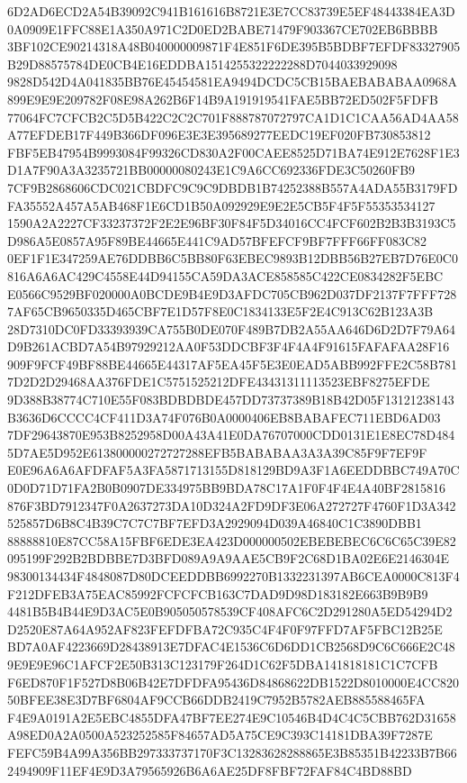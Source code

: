 \documentclass[UTF8,fontset=fandol,zihao=-4,a4paper]{ctexart}
\begin{document}
{{6D2AD6ECD2A54B39092C941B161616B8721E3E7CC83739E5EF48443384EA3D0A0909E1FFC88E1A350A971C2D0ED2BABE71479F903367CE702EB6BBBB
3BF102CE90214318A48B040000009871F4E851F6DE395B5BDBF7EFDF83327905B29D88575784DE0CB4E16EDDBA1514255322222288D7044033929098
9828D542D4A041835BB76E45454581EA9494DCDC5CB15BAEBABABAA0968A899E9E9E209782F08E98A262B6F14B9A191919541FAE5BB72ED502F5FDFB
77064FC7CFCB2C5D5B422C2C2C701F888787072797CA1D1C1CAA56AD4AA58A77EFDEB17F449B366DF096E3E3E395689277EEDC19EF020FB730853812
FBF5EB47954B9993084F99326CD830A2F00CAEE8525D71BA74E912E7628F1E3D1A7F90A3A3235721BB00000080243E1C9A6CC692336FDE3C50260FB9
7CF9B2868606CDC021CBDFC9C9C9DBDB1B74252388B557A4ADA55B3179FDFA35552A457A5AB468F1E6CD1B50A092929E9E2E5CB5F4F5F55353534127
1590A2A2227CF33237372F2E2E96BF30F84F5D34016CC4FCF602B2B3B3193C5D986A5E0857A95F89BE44665E441C9AD57BFEFCF9BF7FFF66FF083C82
0EF1F1E347259AE76DDBB6C5BB80F63EBEC9893B12DBB56B27EB7D76E0C0816A6A6AC429C4558E44D94155CA59DA3ACE858585C422CE0834282F5EBC
E0566C9529BF020000A0BCDE9B4E9D3AFDC705CB962D037DF2137F7FFF7287AF65CB9650335D465CBF7E1D57F8E0C1834133E5F2E4C913C62B123A3B
28D7310DC0FD33393939CA755B0DE070F489B7DB2A55AA646D6D2D7F79A64D9B261ACBD7A54B97929212AA0F53DDCBF3F4F4A4F91615FAFAFAA28F16
909F9FCF49BF88BE44665E44317AF5EA45F5E3E0EAD5ABB992FFE2C58B7817D2D2D29468AA376FDE1C5751525212DFE43431311113523EBF8275EFDE
9D388B38774C710E55F083BDBDBDE457DD73737389B18B42D05F13121238143B3636D6CCCC4CF411D3A74F076B0A0000406EB8BABAFEC711EBD6AD03
7DF29643870E953B8252958D00A43A41E0DA76707000CDD0131E1E8EC78D4845D7AE5D952E613800000272727288EFB5BABABAA3A3A39C85F9F7EF9F
E0E96A6A6AFDFAF5A3FA5871713155D818129BD9A3F1A6EEDDBBC749A70C0D0D71D71FA2B0B0907DE334975BB9BDA78C17A1F0F4F4E4A40BF2815816
876F3BD7912347F0A2637273DA10D324A2FD9DF3E06A272727F4760F1D3A342525857D6B8C4B39C7C7C7BF7EFD3A2929094D039A46840C1C3890DBB1
88888810E87CC58A15FBF6EDE3EA423D000000502EBEBEBEC6C6C65C39E82095199F292B2BDBBE7D3BFD089A9A9AAE5CB9F2C68D1BA02E6E2146304E
98300134434F4848087D80DCEEDDBB6992270B1332231397AB6CEA0000C813F4F212DFEB3A75EAC85992FCFCFCB163C7DAD9D98D183182E663B9B9B9
4481B5B4B44E9D3AC5E0B905050578539CF408AFC6C2D291280A5ED54294D2D2520E87A64A952AF823FEFDFBA72C935C4F4F0F97FFD7AF5FBC12B25E
BD7A0AF4223669D28438913E7DFAC4E1536C6D6DD1CB2568D9C6C666E2C489E9E9E96C1AFCF2E50B313C123179F264D1C62F5DBA141818181C1C7CFB
F6ED870F1F527D8B06B42E7DFDFA95436D84868622DB1522D8010000E4CC82050BFEE38E3D7BF6804AF9CCB66DDB2419C7952B5782AEB885588465FA
F4E9A0191A2E5EBC4855DFA47BF7EE274E9C10546B4D4C4C5CBB762D31658A98ED0A2A0500A523252585F84657AD5A75CE9C393C14181DBA39F7287E
FEFC59B4A99A356BB297333737170F3C13283628288865E3B85351B42233B7B662494909F11EF4E9D3A79565926B6A6AE25DF8FBF72FAF84C4BD88BD
}}
\end{document}

